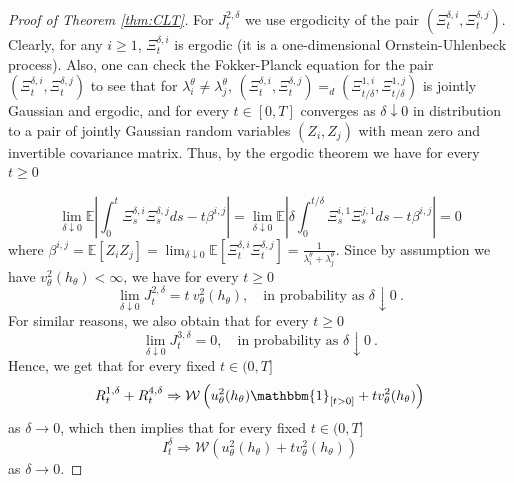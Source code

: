 \documentclass{article}
\newcommand{\indicator}[1]{\mathbbm{1}_{\left[ {#1} \right] }}
\begin{document}
\begin{proof} [Proof of Theorem \ref{thm:CLT}]
For $J^{2,\delta}_{t}$ we use ergodicity of the pair $(\Xi^{\delta,i}_{t}, \Xi^{\delta,j}_{t})$. Clearly, for any $i\geq 1$, $\Xi^{\delta,i}_{t}$ is ergodic (it is a one-dimensional Ornstein-Uhlenbeck process). Also, one can check the Fokker-Planck equation for the pair $(\Xi^{\delta,i}_{t}, \Xi^{\delta,j}_{t})$ to see that for $\lambda_{i}^{\theta}\neq \lambda_{j}^{\theta}$, $(\Xi^{\delta,i}_{t}, \Xi^{\delta,j}_{t})=_d(\Xi^{1,i}_{t/\delta}, \Xi^{1,j}_{t/\delta})$ is jointly Gaussian and ergodic, and for every $t\in[0,T]$ converges as $\delta\downarrow 0$ in distribution to  a pair of jointly Gaussian random variables $(Z_{i},Z_{j})$ with mean zero and invertible covariance matrix. Thus, by the ergodic theorem we have for every $t\geq 0$

\begin{equation}
\lim_{\delta\downarrow 0}\mathbb{E}\left|\int_{0}^{t}\Xi^{\delta,i}_{s}\Xi^{\delta,j}_{s}ds- t\beta^{i,j}\right|=\lim_{\delta\downarrow 0}\mathbb{E}\left|\delta\int_{0}^{t/\delta}\Xi^{i,1}_{s}\Xi^{j,1}_{s}ds- t\beta^{i,j}\right|=0
\end{equation}
where $\beta^{i,j}=\mathbb{E}[Z_{i}Z_{j}]=\lim_{\delta\downarrow 0}\mathbb{E}\left[\Xi^{\delta,i}_{t}\Xi^{\delta,j}_{t}\right]=\frac{1}{\lambda_i^{\theta}+\lambda_j^{\theta}}$. Since by assumption we have $v^{2}_{\theta}(h_{\theta})<\infty$, we have for every $t\geq 0$
\begin{equation}
\lim_{\delta\downarrow 0}J^{2,\delta}_{t}=t ~v^{2}_{\theta}(h_{\theta}), \quad \text{in probability as }\delta\downarrow 0\ .
\end{equation}
For similar reasons, we also obtain that for every $t\geq 0$
\begin{equation}
\lim_{\delta\downarrow 0}J^{3,\delta}_{t}=0, \quad \text{in probability as }\delta\downarrow 0\ .
\label{Eq:J3limit}
\end{equation}
Hence, we get that for every fixed $t\in(0,T]$
\begin{equation}
R^{1,\delta}_{t}+R^{4,\delta}_{t}\Rightarrow  \mathcal{W}\left(u^{2}_{\theta}(h_{\theta})\indicator{t>0}+ t v^{2}_{\theta}(h_{\theta})\right)
\end{equation}
as $\delta\rightarrow 0$, which then implies that for every fixed $t\in(0,T]$
\begin{equation}
I^{\delta}_{t}\Rightarrow  \mathcal{W}\left(u^{2}_{\theta}(h_{\theta})+ t v^{2}_{\theta}(h_{\theta})\right)
\end{equation}
as $\delta\rightarrow 0$.
\end{proof}
\end{document}
